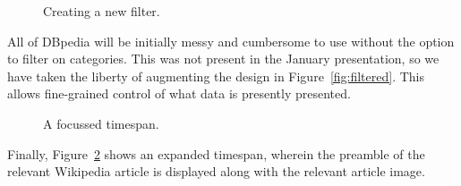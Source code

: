 \begin{figure}[H]
  \centering
  \begin{scale}{0.5}
    
  \end{scale}
  \caption{Creating a new filter.}
  \label{fig:filters}
\end{figure}

All of DBpedia will be initially messy and cumbersome to use without the 
option to filter on categories. This was not present in the January 
presentation, so we have taken the liberty of augmenting the design in 
Figure~\ref{fig:filtered}. This allows fine-grained control of what data is 
presently presented.

\begin{figure}[H]
  \centering
  \begin{scale}{0.3}
    
  \end{scale}
  \caption{A focussed timespan.}
  \label{fig:focussed}
\end{figure}

Finally, Figure~\ref{fig:focussed} shows an expanded timespan, wherein the 
preamble of the relevant Wikipedia article is displayed along with the 
relevant article image.
